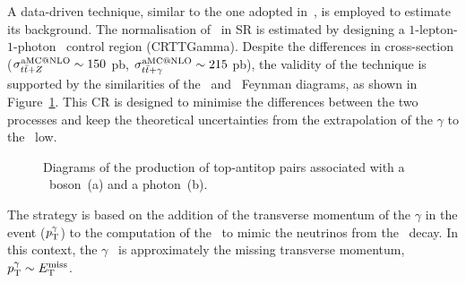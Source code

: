 		A data-driven technique, similar to the one adopted in~\cite{stop1L}, is employed to estimate its background. The normalisation of \ttZ\ in \ac{SR} is estimated by designing a $1$-lepton-$1$-photon \ttgamma\ control region (CRTTGamma). Despite the differences in cross-section ($\sigma_{t\bar{t}+Z}^{\mathrm{aMC@NLO}} \sim 150$ pb, $\sigma_{t\bar{t}+\gamma}^{\mathrm{aMC@NLO}} \sim 215$ pb), the validity of the technique is supported by the similarities of the \ttZ\ and \ttgamma\ Feynman diagrams, as shown in Figure~\ref{fig:ttZttGamma}. This \ac{CR} is designed to minimise the differences between the two processes and keep the theoretical uncertainties from the extrapolation of the $\gamma$ to the \Zboson\ low. 

		\begin{figure}[htpb]
		  \centering
		    \caption{Diagrams of the production of top-antitop pairs associated with a \Zboson\ boson~(a) and a photon~(b).}
		    \label{fig:ttZttGamma}
		\end{figure}

		The strategy is based on the addition of the transverse momentum of the $\gamma$ in the event ($p_{\mathrm{T}}^{\gamma}$) to the computation of the \met\ to mimic the neutrinos from the \Zboson\ decay. In this context, the $\gamma$ \pt\ is approximately the missing transverse momentum, $p_{\mathrm{T}}^{\gamma} \sim E_{\mathrm{T}}^{\mathrm{miss}}$. 

